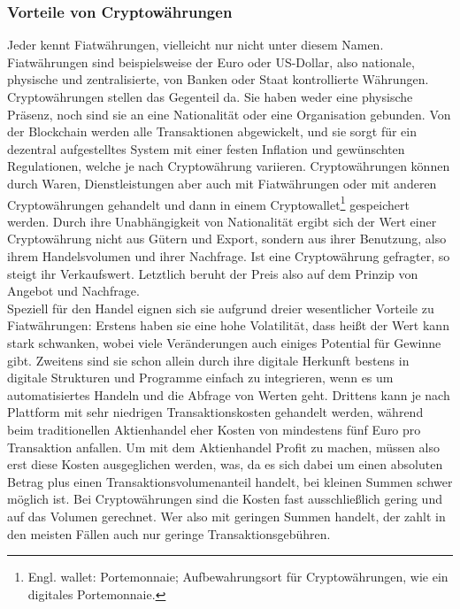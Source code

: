 \documentclass[12pt]{article}
\begin{document}
	\subsubsection{Vorteile von Cryptowährungen}
		Jeder kennt Fiatwährungen, vielleicht nur nicht unter diesem Namen. Fiatwährungen sind beispielsweise der Euro oder US-Dollar, also nationale, physische und zentralisierte, von Banken oder Staat kontrollierte Währungen. Cryptowährungen stellen das Gegenteil da. Sie haben weder eine physische Präsenz, noch sind sie an eine Nationalität oder eine Organisation gebunden. Von der Blockchain werden alle Transaktionen abgewickelt, und sie sorgt für ein dezentral aufgestelltes System mit einer festen Inflation und gewünschten Regulationen, welche je nach Cryptowährung variieren. Cryptowährungen können durch Waren, Dienstleistungen aber auch mit Fiatwährungen oder mit anderen Cryptowährungen gehandelt und dann in einem Cryptowallet\footnote{Engl. wallet: Portemonnaie; Aufbewahrungsort für Cryptowährungen, wie ein digitales Portemonnaie.} gespeichert werden. Durch ihre Unabhängigkeit von Nationalität ergibt sich der Wert einer Cryptowährung nicht aus Gütern und Export, sondern aus ihrer Benutzung, also ihrem Handelsvolumen und ihrer Nachfrage. Ist eine Cryptowährung gefragter, so steigt ihr Verkaufswert. Letztlich beruht der Preis also auf dem Prinzip von Angebot und Nachfrage.\\
		Speziell für den Handel eignen sich sie aufgrund dreier wesentlicher Vorteile zu Fiatwährungen: Erstens haben sie eine hohe Volatilität, dass heißt der Wert kann stark schwanken, wobei viele Veränderungen auch einiges Potential für Gewinne gibt. Zweitens sind sie schon allein durch ihre digitale Herkunft bestens in digitale Strukturen und Programme einfach zu integrieren, wenn es um automatisiertes Handeln und die Abfrage von Werten geht. Drittens kann je nach Plattform mit sehr niedrigen Transaktionskosten gehandelt werden, während beim traditionellen Aktienhandel eher Kosten von mindestens fünf Euro pro Transaktion anfallen. Um mit dem Aktienhandel Profit zu machen, müssen also erst diese Kosten ausgeglichen werden, was, da es sich dabei um einen absoluten Betrag plus einen Transaktionsvolumenanteil handelt, bei kleinen Summen schwer möglich ist. Bei Cryptowährungen sind die Kosten fast ausschließlich gering und auf das Volumen gerechnet. Wer also mit geringen Summen handelt, der zahlt in den meisten Fällen auch nur geringe Transaktionsgebühren.
\end{document}
